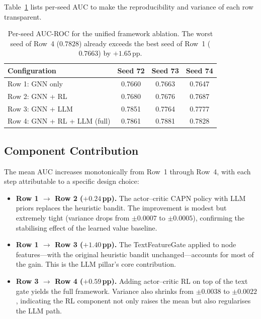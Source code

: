 \noindent
Table~\ref{tab:main-framework-per-seed} lists per-seed AUC to make the reproducibility and variance of each row transparent.

\begin{table}[h!]
\centering
\begin{tabular}{lccc}
\toprule
\textbf{Configuration} & \textbf{Seed 72} & \textbf{Seed 73} & \textbf{Seed 74} \\
\midrule
Row 1: GNN only               & 0.7660 & 0.7663 & 0.7647 \\
Row 2: GNN + RL               & 0.7680 & 0.7676 & 0.7687 \\
Row 3: GNN + LLM              & 0.7851 & 0.7764 & 0.7777 \\
Row 4: GNN + RL + LLM (full)  & 0.7861 & 0.7881 & 0.7828 \\
\bottomrule
\end{tabular}
\caption{Per-seed AUC-ROC for the unified framework ablation. The worst seed of Row~4 ($0.7828$) already exceeds the best seed of Row~1 ($0.7663$) by $+1.65$\,pp.}
\label{tab:main-framework-per-seed}
\end{table}

\subsection{Component Contribution}
\label{sec:yelp-component-contribution}

The mean AUC increases monotonically from Row~1 through Row~4, with each step attributable to a specific design choice:
\begin{itemize}
    \item \textbf{Row 1 $\to$ Row 2 ($+0.24$\,pp).} The actor--critic CAPN policy with LLM priors replaces the heuristic bandit. The improvement is modest but extremely tight (variance drops from $\pm 0.0007$ to $\pm 0.0005$), confirming the stabilising effect of the learned value baseline.
    \item \textbf{Row 1 $\to$ Row 3 ($+1.40$\,pp).} The TextFeatureGate applied to node features---with the original heuristic bandit unchanged---accounts for most of the gain. This is the LLM pillar's core contribution.
    \item \textbf{Row 3 $\to$ Row 4 ($+0.59$\,pp).} Adding actor--critic RL on top of the text gate yields the full framework. Variance also shrinks from $\pm 0.0038$ to $\pm 0.0022$, indicating the RL component not only raises the mean but also regularises the LLM path.
\end{itemize}

